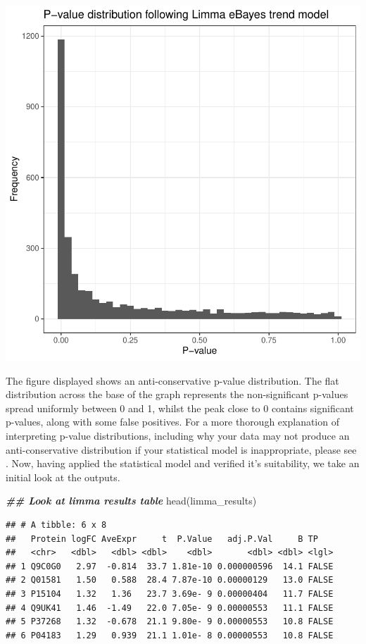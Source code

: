 \documentclass[9pt,a4paper,]{extarticle}
\newenvironment{Shaded}{\begin{snugshade}}{\end{snugshade}}
\newcommand{\DocumentationTok}[1]{\textcolor[rgb]{0.56,0.35,0.01}{\textbf{\textit{#1}}}}
\newcommand{\FunctionTok}[1]{\textcolor[rgb]{0.00,0.00,0.00}{#1}}
\newcommand{\NormalTok}[1]{#1}
\begin{document}
\begin{center}\includegraphics[height=0.3\textheight]{workflow_expressions_files/figure-latex/pvalue_histogram-1} \end{center}

The figure displayed shows an anti-conservative p-value distribution. The flat
distribution across the base of the graph represents the non-significant p-values
spread uniformly between 0 and 1, whilst the peak close to 0 contains significant
p-values, along with some false positives. For a more thorough explanation of
interpreting p-value distributions, including why your data may not produce an
anti-conservative distribution if your statistical model is inappropriate, please
see \citep{p_val}. Now, having applied the statistical model and verified it's
suitability, we take an initial look at the outputs.

\begin{Shaded}
\begin{Highlighting}[]
\DocumentationTok{\#\# Look at limma results table}
\FunctionTok{head}\NormalTok{(limma\_results)}
\end{Highlighting}
\end{Shaded}

\begin{verbatim}
## # A tibble: 6 x 8
##   Protein logFC AveExpr     t  P.Value   adj.P.Val     B TP   
##   <chr>   <dbl>   <dbl> <dbl>    <dbl>       <dbl> <dbl> <lgl>
## 1 Q9C0G0   2.97  -0.814  33.7 1.81e-10 0.000000596  14.1 FALSE
## 2 Q01581   1.50   0.588  28.4 7.87e-10 0.00000129   13.0 FALSE
## 3 P15104   1.32   1.36   23.7 3.69e- 9 0.00000404   11.7 FALSE
## 4 Q9UK41   1.46  -1.49   22.0 7.05e- 9 0.00000553   11.1 FALSE
## 5 P37268   1.32  -0.678  21.1 9.80e- 9 0.00000553   10.8 FALSE
## 6 P04183   1.29   0.939  21.1 1.01e- 8 0.00000553   10.8 FALSE
\end{verbatim}
\end{document}
